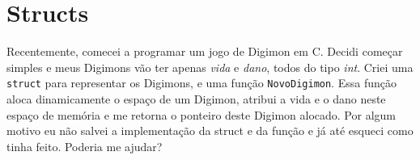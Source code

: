 \documentclass[a4paper]{article}
\begin{document}
    \begin{tcolorbox}
        
    \end{tcolorbox}


    \newpage

    \section*{Structs}

    Recentemente, comecei a programar um jogo de Digimon em C. Decidi começar
    simples e meus Digimons vão ter apenas \textit{vida} e \textit{dano}, todos
    do tipo \textit{int}. Criei uma \verb|struct| para representar os Digimons,
    e uma função \verb|NovoDigimon|. Essa função aloca
    dinamicamente o espaço de um Digimon, atribui a vida e o dano neste espaço
    de memória e me retorna o ponteiro deste Digimon alocado. Por algum motivo
    eu não salvei a implementação da struct e da função e já até esqueci como
    tinha feito. Poderia me ajudar?

    \begin{tcolorbox}
        
    \end{tcolorbox}
\end{document}
